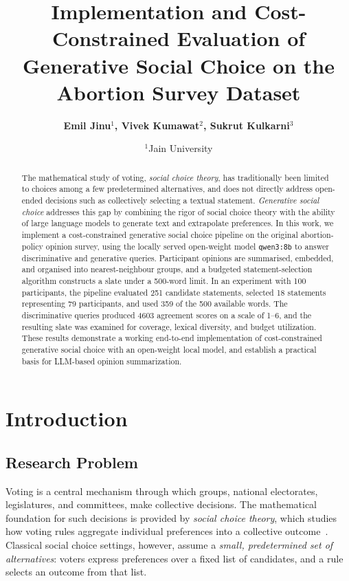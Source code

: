 \documentclass[letterpaper,11pt]{article}
\title{Implementation and Cost-Constrained Evaluation of Generative Social Choice on the Abortion Survey Dataset}
\author{\textbf{Emil Jinu$^1$, Vivek Kumawat$^2$, Sukrut Kulkarni$^3$}}
\date{\large $^1$Jain University\hspace{.3cm}}
\theoremstyle{plain}
\theoremstyle{definition}
\begin{document}
\maketitle

\begin{abstract}
The mathematical study of voting, \emph{social choice theory}, has traditionally been limited to choices among a few predetermined alternatives, and does not directly address open-ended decisions such as collectively selecting a textual statement. \emph{Generative social choice} addresses this gap by combining the rigor of social choice theory with the ability of large language models to generate text and extrapolate preferences. In this work, we implement a cost-constrained generative social choice pipeline on the original abortion-policy opinion survey, using the locally served open-weight model \texttt{qwen3:8b} to answer discriminative and generative queries. Participant opinions are summarised, embedded, and organised into nearest-neighbour groups, and a budgeted statement-selection algorithm constructs a slate under a 500-word limit. In an experiment with 100 participants, the pipeline evaluated 251 candidate statements, selected 18 statements representing 79 participants, and used 359 of the 500 available words. The discriminative queries produced 4603 agreement scores on a scale of 1--6, and the resulting slate was examined for coverage, lexical diversity, and budget utilization. These results demonstrate a working end-to-end implementation of cost-constrained generative social choice with an open-weight local model, and establish a practical basis for LLM-based opinion summarization.
\end{abstract}



\section{Introduction}

\subsection{Research Problem}

Voting is a central mechanism through which groups, national electorates, legislatures, and committees, make collective decisions. The mathematical foundation for such decisions is provided by \emph{social choice theory}, which studies how voting rules aggregate individual preferences into a collective outcome~\citep{aziz2017jr}. Classical social choice settings, however, assume a \emph{small, predetermined set of alternatives}: voters express preferences over a fixed list of candidates, and a rule selects an outcome from that list.
\end{document}
